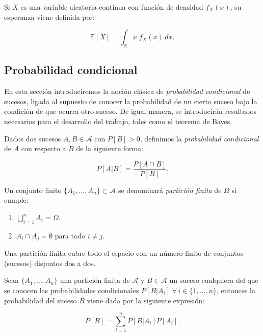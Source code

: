 \begin{observacion}
    Si $X$ es una variable aleatoria continua con función de densidad $f_X(x)$, su esperanza viene definida por:

    \[ \mathbb{E}[X] =  \int_{\mathbb{R}} x \;f_X(x) \, dx. \]\newline
\end{observacion}

\subsection{Probabilidad condicional}

En esta sección introduciremos la noción clásica de \emph{probabilidad condicional} de sucesos, ligada al supuesto de conocer la probabilidad de un cierto suceso bajo la condición de que ocurra otro suceso. De igual manera, se introducirán resultados necesarios para el desarrollo del trabajo, tales como el teorema de Bayes.\newline

\begin{definicion}\label{def:probabilidad-condicional}
    Dados dos sucesos $A, B \in \mathcal{A}$ con $P[B] > 0$, definimos la \emph{probabilidad condicional} de $A$ con respecto a $B$ de la siguiente forma:

    \[ P[A|B] = \frac{P[A \cap B]}{P[B]}. \]\newline
\end{definicion}

\begin{definicion}\label{def:particion-finita}
    Un conjunto finito $\{A_1, \ldots, A_n \} \subset \mathcal{A}$ se denominará \emph{partición finita} de $\Omega$ si cumple:

    \begin{enumerate}
        \item $\bigcup\limits_{i=1}^n A_i = \Omega$.
        \item $A_i \cap A_j = \emptyset$ para todo $i \neq j$.
    \end{enumerate}
\end{definicion}

Una partición finita cubre todo el espacio con un número finito de conjuntos (sucesos) disjuntos dos a dos.\newline

\begin{teorema}\label{teo:probabilidad-total}
    Sean $\{A_1, \ldots, A_n \}$ una partición finita de $\mathcal{A}$ y $B \in \mathcal{A}$ un suceso cualquiera del que se conocen las probabilidades condicionales $P[B|A_i] \; \forall \, i \in \{1, \ldots, n \}$, entonces la probabilidad del suceso $B$ viene dada por la siguiente expresión:

    \[ P[B] = \sum_{i=1}^{n} P[B|A_i]P[A_i]. \]\newline
\end{teorema}

